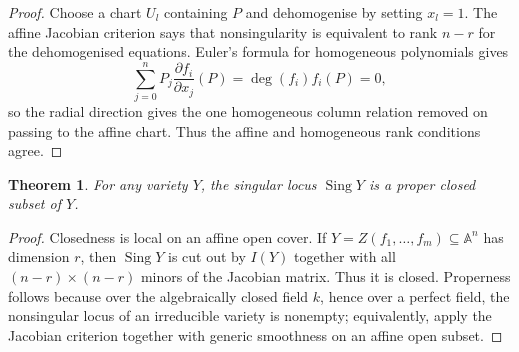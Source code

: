 \documentclass[12pt]{article}
\theoremstyle{plain}
\newtheorem{thm}{Theorem}[subsection] %
\theoremstyle{definition}
\newcommand{\bb}[1]{\mathbb{#1}}
\begin{document}
\begin{proof}
Choose a chart $U_l$ containing $P$ and dehomogenise by setting $x_l=1$. The affine Jacobian criterion says that nonsingularity is equivalent to rank $n-r$ for the dehomogenised equations. Euler's formula for homogeneous polynomials gives
\[
\sum_{j=0}^n P_j\frac{\partial f_i}{\partial x_j}(P)=\deg(f_i)f_i(P)=0,
\]
so the radial direction gives the one homogeneous column relation removed on passing to the affine chart. Thus the affine and homogeneous rank conditions agree.
\end{proof}
\begin{thm}\label{thm:singular_locus_closed}
For any variety $Y$, the singular locus $\operatorname{Sing}Y$ is a proper closed subset of $Y$.
\end{thm}
\begin{proof}
Closedness is local on an affine open cover. If $Y=Z(f_1,\ldots,f_m)\subseteq\bb A^n$ has dimension $r$, then $\operatorname{Sing}Y$ is cut out by $I(Y)$ together with all $(n-r)\times(n-r)$ minors of the Jacobian matrix. Thus it is closed. Properness follows because over the algebraically closed field $k$, hence over a perfect field, the nonsingular locus of an irreducible variety is nonempty; equivalently, apply the Jacobian criterion together with generic smoothness on an affine open subset.
\end{proof}
\end{document}
